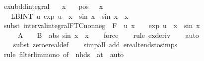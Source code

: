 \documentclass{article}
\theoremstyle{definition}
\begin{document}
\begin{figure}
\begin{isabellebody}
\isamarkupfalse%
\ ex{\isacharunderscore}{}{}{\isacharunderscore}{}{\isacharunderscore}{}{\isacharunderscore}ubdd{\isacharunderscore}integral{\isacharcolon}\isanewline
\ \ \ x\isanewline
\ \ \ pos{\isacharcolon}\ {\isachardoublequoteopen}{}\ {\isacharless}\ x{\isachardoublequoteclose}\isanewline
\ \ \ {\isachardoublequoteopen}LBINT\ u{\isacharequal}{}{\isachardot}{\isachardot}{\isasyminfinity}{\isachardot}\ {\isasymbar}exp\ {\isacharparenleft}{\isacharminus}u\ {\isacharasterisk}\ x{\isacharparenright}\ {\isacharasterisk}\ sin\ x{\isasymbar}\ {\isacharequal}\ {\isasymbar}sin\ x{\isasymbar}\ {\isacharslash}\ x{\isachardoublequoteclose}\ \isanewline
{}\isamarkupfalse%
\ {\isacharparenleft}subst\ interval{\isacharunderscore}integral{\isacharunderscore}FTC{\isacharunderscore}nonneg\ {\isacharbrackleft}\ F\ {\isacharequal}\ {\isachardoublequoteopen}{\isasymlambda}u{\isachardot}\ {}{\isacharslash}x\ {\isacharasterisk}\ {\isacharparenleft}{}\ {\isacharminus}\ exp\ {\isacharparenleft}{\isacharminus}u\ {\isacharasterisk}\ x{\isacharparenright}{\isacharparenright}\ {\isacharasterisk}\ {\isasymbar}sin\ x{\isasymbar}{\isachardoublequoteclose}\isanewline
\ \ \ \ \ A\ {\isacharequal}\ {}\ \ B\ {\isacharequal}\ {\isachardoublequoteopen}abs\ {\isacharparenleft}sin\ x{\isacharparenright}\ {\isacharslash}\ x{\isachardoublequoteclose}{\isacharbrackright}{\isacharparenright}\isanewline
\ \ \isamarkupfalse%
\ force\isanewline
\ \ \isamarkupfalse%
\ {\isacharparenleft}rule\ ex{\isacharunderscore}{}{}{\isacharunderscore}{}{\isacharunderscore}{}{\isacharunderscore}deriv{\isacharparenright}\isanewline
\ \ \isamarkupfalse%
\ auto\isanewline
\ \ \isanewline
\ \ \isamarkupfalse%
\ {\isacharparenleft}subst\ zero{\isacharunderscore}ereal{\isacharunderscore}def{\isacharparenright}{\isacharplus}\isanewline
\ \ \isamarkupfalse%
\ {\isacharparenleft}simp{\isacharunderscore}all\ add{\isacharcolon}\ ereal{\isacharunderscore}tendsto{\isacharunderscore}simps{\isacharparenright}\isanewline
\ \ \isanewline
\ \ \isamarkupfalse%
\ {\isacharparenleft}rule\ filterlim{\isacharunderscore}mono\ {\isacharbrackleft}of\ {\isacharunderscore}\ {\isachardoublequoteopen}nhds\ {}{\isachardoublequoteclose}\ {\isachardoublequoteopen}at\ {}{\isachardoublequoteclose}{\isacharbrackright}{\isacharcomma}\ auto{\isacharparenright}\isanewline

\end{isabellebody}
\end{figure}
\end{document}
